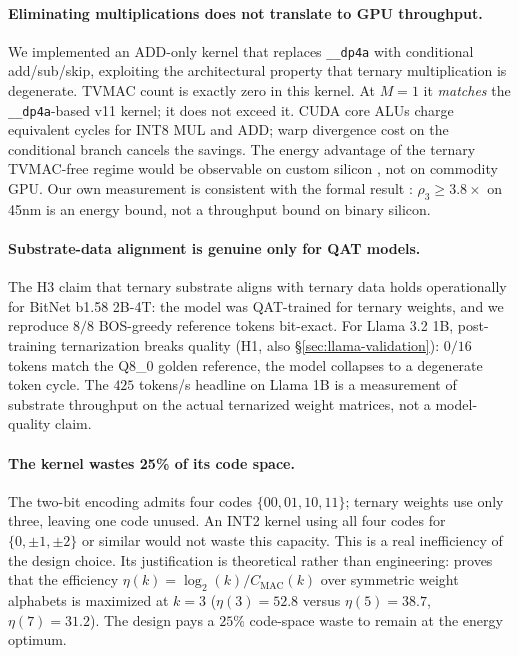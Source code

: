 \documentclass{article}
\begin{document}
\paragraph{Eliminating multiplications does not translate to GPU
throughput.} We implemented an {ADD}-only kernel that replaces
\texttt{\_\_dp4a} with conditional add/sub/skip, exploiting the
architectural property that ternary multiplication is degenerate.
{TVMAC} count is exactly zero in this kernel. At $M=1$ it
\emph{matches} the \texttt{\_\_dp4a}-based v11 kernel; it does not
exceed it. {CUDA} core {ALU}s charge equivalent cycles for {INT8}
{MUL} and {ADD}; warp divergence cost on the conditional branch
cancels the savings. The energy advantage of the ternary
{TVMAC}-free regime would be observable on custom silicon
\citep{horowitz-energy-2014,cutie-2020}, not on commodity {GPU}. Our
own measurement is consistent with the formal result
\citep[Prop.~2]{cuevas-formal-2026}: $\rho_3 \geq 3.8\times$ on 45nm
is an energy bound, not a throughput bound on binary silicon.

\paragraph{Substrate-data alignment is genuine only for {QAT}
models.} The H3 claim that ternary substrate aligns with ternary data
holds operationally for BitNet b1.58 2B-4T: the model was {QAT}-trained
for ternary weights, and we reproduce $8/8$ {BOS}-greedy reference
tokens bit-exact. For Llama 3.2 1B, post-training ternarization
breaks quality (H1, also \S\ref{sec:llama-validation}): $0/16$ tokens
match the {Q8\_0} golden reference, the model collapses to a
degenerate token cycle. The $425$ tokens/s headline on Llama 1B is
a measurement of substrate throughput on the actual ternarized weight
matrices, not a model-quality claim.

\paragraph{The kernel wastes 25\% of its code space.} The two-bit
encoding admits four codes $\{00, 01, 10, 11\}$; ternary weights use
only three, leaving one code unused. An {INT2} kernel using all four
codes for $\{0, \pm 1, \pm 2\}$ or similar would not waste this
capacity. This is a real inefficiency of the design choice. Its
justification is theoretical rather than engineering:
\citet[Prop.~5]{cuevas-formal-2026} proves that the efficiency
$\eta(k) = \log_2(k) / C_{\mathrm{MAC}}(k)$ over symmetric weight
alphabets is maximized at $k=3$ ($\eta(3) = 52.8$ versus $\eta(5) =
38.7$, $\eta(7) = 31.2$). The design pays a $25\%$ code-space waste
to remain at the energy optimum.
\end{document}
